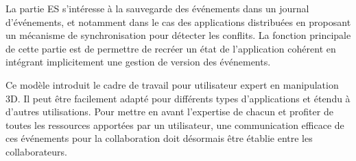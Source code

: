 La partie \gls{ES} s'intéresse à la sauvegarde des événements dans un journal 
d'événements, et notamment dans le cas des applications distribuées en proposant 
un mécanisme de synchronisation pour détecter les conflits. La fonction principale 
de cette partie est de permettre de recréer un état de l'application cohérent en 
intégrant implicitement une gestion de version des événements.

Ce modèle introduit le cadre de travail pour utilisateur expert en manipulation 
\gls{3D}. Il peut être facilement adapté pour différents types d'applications et étendu à 
d'autres utilisations. 
Pour mettre en avant l'expertise de chacun et profiter de 
toutes les ressources apportées par un utilisateur, une communication efficace de 
ces événements pour la collaboration doit désormais être établie entre les 
collaborateurs.